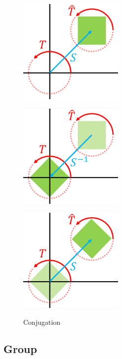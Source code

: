 \begin{figure}[htbp]
 \begin{minipage}{0.33\hsize}
  \center
  \includegraphics[width=2in, height=2in, keepaspectratio]{../img/klein/conjugation1.pdf}
   \subcaption{}
  \label{fig:conju1}
 \end{minipage}
 \begin{minipage}{0.33\hsize}
  \center
  \includegraphics[width=2in, height=2in, keepaspectratio]{../img/klein/conjugation2.pdf}
  \subcaption{}
   \label{fig:conju2}
 \end{minipage}
 \begin{minipage}{0.33\hsize}
  \center
  \includegraphics[width=2in, height=2in, keepaspectratio]{../img/klein/conjugation3.pdf}
  \subcaption{}
   \label{fig:conju3}
 \end{minipage}
 \caption{Conjugation}
\end{figure}

\subsection{Group}

